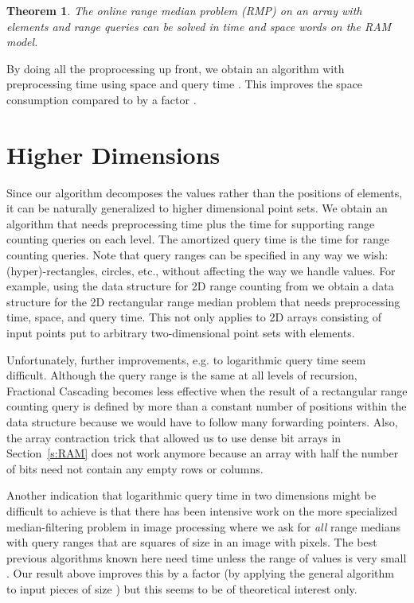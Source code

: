 \documentclass[a4paper,10pt]{article}
\newtheorem{theorem}{Theorem}
\begin{document}
\begin{theorem}
  The online range median problem (RMP) on an array with  elements
  and  range queries can be solved in time  and
  space  words on the RAM model.
\end{theorem}

By doing all the proprocessing up front, we obtain an algorithm
with preprocessing time  using  space and query time .
This improves the space consumption compared to \cite{DBLP:journals/njc/KrizancMS05} by a factor . 



\section{Higher Dimensions}\label{s:highd}

Since our algorithm decomposes the values rather than the positions of
elements, it can be naturally generalized to higher dimensional point
sets. We obtain an algorithm that needs  preprocessing
time plus the time for supporting range counting queries on each
level.  The amortized query time is the time for  range
counting queries.  Note that query ranges can be specified in any way
we wish: (hyper)-rectangles, circles, etc., without affecting the way
we handle values.  For example, using the
data structure for 2D range counting from \cite{DBLP:conf/isaac/JaJaMS04} we obtain a
data structure for the 2D rectangular range median problem that needs
 preprocessing time,  space, and
 query time. This not only applies to 2D arrays consisting
of  input points put to arbitrary two-dimensional point sets with
 elements.  

Unfortunately, further improvements, e.g. to logarithmic query time
seem difficult. Although the query range is the same at all levels of
recursion, Fractional Cascading becomes less effective when the result of a
rectangular range counting query is defined by more than a constant
number of positions within the data structure because we would
have to follow many forwarding pointers.  Also, the
array contraction trick that allowed us to use 
dense bit arrays
in Section~\ref{s:RAM} does not work anymore because an array with
half the number of bits need not contain any empty rows or columns.

Another indication that logarithmic query time in two dimensions might
be difficult to achieve is that there has been intensive work on the
more specialized median-filtering problem in image processing where we
ask for \emph{all} range medians with query ranges that are squares of
size  in an image with  pixels. The best previous algorithms known here need
time \cite{GilWerman} unless the range of values is very small
\cite{2Dmedian1,2Dmedian2}. Our result above improves this by a factor  
(by applying the general algorithm to input pieces of size ) but this
seems to be of theoretical interest only.
\end{document}
